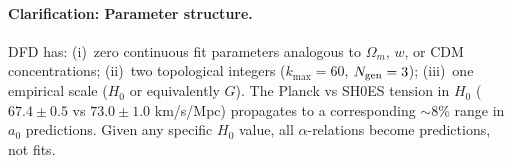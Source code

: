 \paragraph{Clarification: Parameter structure.}
DFD has: (i)~zero continuous fit parameters analogous to $\Omega_m$, $w$, or CDM concentrations; (ii)~two topological integers ($k_{\max} = 60$, $N_{\rm gen} = 3$); (iii)~one empirical scale ($H_0$ or equivalently $G$). The Planck vs SH0ES tension in $H_0$ ($67.4 \pm 0.5$ vs $73.0 \pm 1.0$ km/s/Mpc) propagates to a corresponding $\sim$8\% range in $a_0$ predictions. Given any specific $H_0$ value, all $\alpha$-relations become predictions, not fits.
